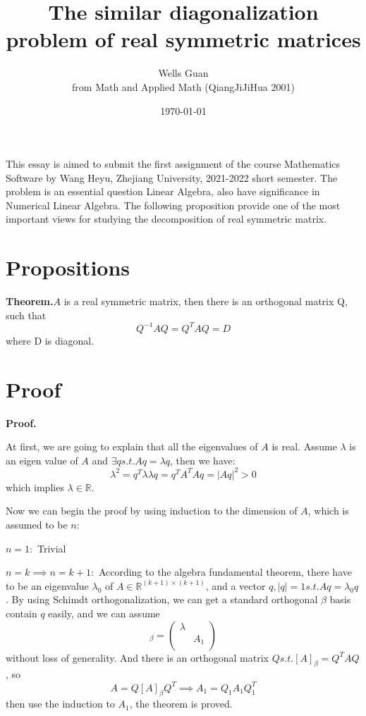 \documentclass{article}
\title{The similar diagonalization problem of real symmetric matrices}
\author{Wells Guan \\ from Math and Applied Math (QiangJiJiHua 2001) }
\date{\today}
\begin{document}
\maketitle
\newpage

This essay is aimed to submit the first assignment of the course Mathematics Software by Wang Heyu, Zhejiang University, 2021-2022 short semester. The problem is an essential question Linear Algebra, also have significance in Numerical Linear Algebra. The following proposition provide one of the most important views for studying the decomposition of real symmetric matrix.
\section{Propositions}

\textbf{Theorem.}$A$ is a real symmetric matrix, then there is an orthogonal matrix Q, such that
\begin{equation}Q^{-1}AQ = Q^TAQ = D\end{equation}
where D is diagonal.\par

\section{Proof}

\textbf{Proof.}\par
    At first, we are going to explain that all the eigenvalues of $A$ is real. 
    Assume $\lambda$ is an eigen value of $A$ and $\exists q s.t. Aq = \lambda q$, then we have:
    \begin{equation}
    \lambda^2 = q^T \lambda \lambda q = q^TA^TAq = |Aq|^2 >0  
    \end{equation}
    which implies $\lambda \in \mathbb{R}$.
    
    Now we can begin the proof by using induction to the dimension of $A$, which is assumed to be $n$: \par
    
    $n=1:$ Trivial \par
    $n=k \implies n=k+1:$ According to the algebra fundamental theorem, 
    there have to be an eigenvalue $\lambda_0$ of $A\in \mathbb{R}^{(k+1)\times (k+1)}$, and a vector $q, |q| = 1 s.t. Aq = \lambda_0 q$. 
    By using Schimdt orthogonalization, we can get a standard orthogonal $\beta$ basis contain $q$ easily,
    and we can assume
    \begin{equation}
    [A]_{\beta} = 
    \left(
    \begin{array}{cc}
        \lambda & \\
            & A_1 \\
    \end{array}\right)
    \end{equation}
    without loss of generality. And there is an orthogonal matrix $Q s.t. [A]_{\beta} = Q^TAQ$, so
    \begin{equation}
    A = Q[A]_{\beta}Q^T \implies A_1 = Q_1 A_1 Q_1^T    
    \end{equation}
    then use the induction to $A_1$, the theorem is proved.
\end{document}

